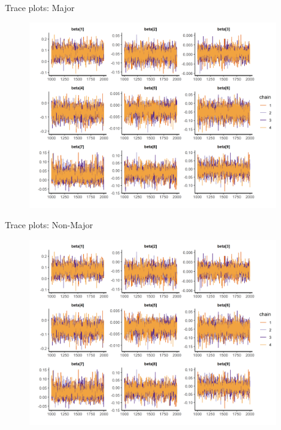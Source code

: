 \documentclass{beamer}
\begin{document}
\begin{frame}{Trace plots: Major}

\begin{figure}
	\centering
		\includegraphics[width=0.95\textwidth]{beta-trace-maj.png}
\end{figure}


\end{frame}


\begin{frame}{Trace plots: Non-Major}

\begin{figure}
	\centering
		\includegraphics[width=0.95\textwidth]{beta-trace-maj.png}
\end{figure}


\end{frame}
\end{document}
